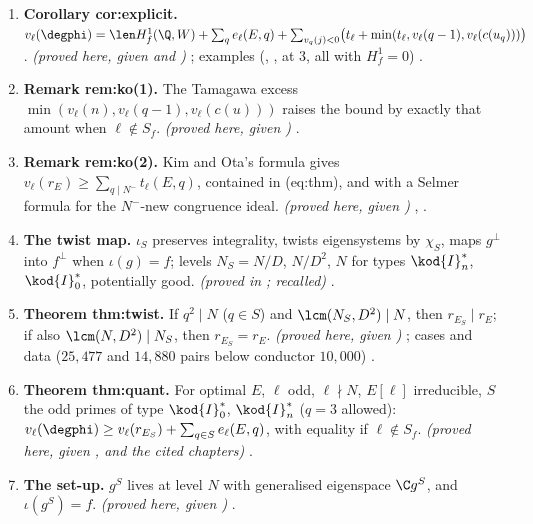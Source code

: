 \begin{enumerate}[label=\textbf{\thechapter.\arabic*}]
an equality with no multiplicity-one hypothesis. \emph{(proved here, given the theorems of Diamond, Flach and Guo and )} ; hypotheses
.
\item \textbf{Corollary cor:explicit.} $v_\ell(\degphi)=\len H^1_f(\Q,W)+\sum_qe_\ell(E,q)+\sum_{v_q(j)<0}\bigl(t_\ell+\min(t_\ell,v_\ell(q-1),v_\ell(c(u_q)))\bigr)$. \emph{(proved here, given  and
)} ; examples (, ,  at $3$, all with $H^1_f=0$) .
\item \textbf{Remark rem:ko(1).} The Tamagawa excess $\min(v_\ell(n),v_\ell(q-1),v_\ell(c(u)))$ raises the bound by exactly that amount when $\ell\notin S_f$. \emph{(proved here, given )}
.
\item \textbf{Remark rem:ko(2).} Kim and Ota's formula gives $v_\ell(r_E)\ge\sum_{q\mid N^-}t_\ell(E,q)$, contained in (eq:thm), and with  a Selmer formula for the $N^-$-new congruence ideal.
\emph{(proved here, given \cite{KimOta})} , .
\item \textbf{The twist map.} $\iota_S$ preserves integrality, twists eigensystems by $\chi_S$, maps $g^\perp$ into $f^\perp$ when $\iota(g)=f$; levels $N_S=N/D$, $N/D^2$, $N$ for types $\kod{I}_n^*$, $\kod{I}_0^*$, potentially good.
\emph{(proved in ; recalled)} .
\item \textbf{Theorem thm:twist.} If $q^2\mid N$ ($q\in S$) and $\lcm(N_S,D^2)\mid N$, then $r_{E_S}\mid r_E$; if also $\lcm(N,D^2)\mid N_S$, then $r_{E_S}=r_E$. \emph{(proved here, given )}
; cases and data ($25{,}477$ and $14{,}880$ pairs below conductor $10{,}000$) .
\item \textbf{Theorem thm:quant.} For optimal $E$, $\ell$ odd, $\ell\nmid N$, $E[\ell]$ irreducible, $S$ the odd primes of type $\kod{I}_0^*$, $\kod{I}_n^*$ ($q=3$ allowed): $v_\ell(\degphi)\ge v_\ell(r_{E_S})+\sum_{q\in S}e_\ell(E,q)$, with
equality if $\ell\notin S_f$. \emph{(proved here, given ,  and the cited chapters)} .
\item \textbf{The set-up.} $g^S$ lives at level $N$ with generalised eigenspace $\C g^S$, and $\iota(g^S)=f$. \emph{(proved here, given )} .

\end{enumerate}
